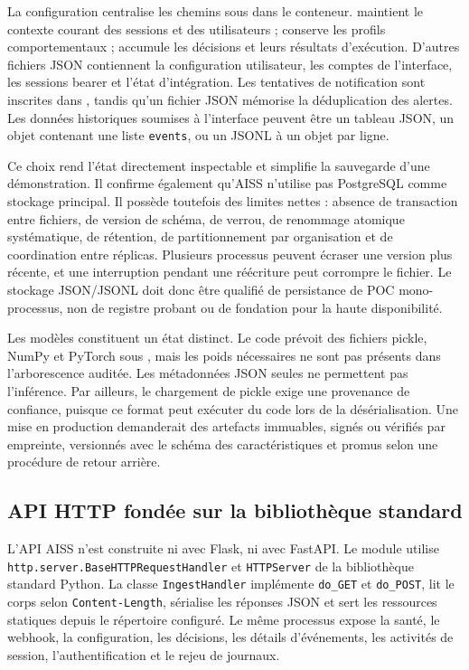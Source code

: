 \documentclass[11pt,a4paper,oneside]{report}
\theoremstyle{definition}
\theoremstyle{plain}
\begin{document}
La configuration centralise les chemins sous  dans le
conteneur.  maintient le contexte courant des
sessions et des utilisateurs ;  conserve les
profils comportementaux ;  accumule les décisions et
leurs résultats d'exécution. D'autres fichiers JSON contiennent la
configuration utilisateur, les comptes de l'interface, les sessions bearer
et l'état d'intégration. Les tentatives de notification sont inscrites dans
, tandis qu'un fichier JSON mémorise la déduplication
des alertes. Les données historiques soumises à l'interface peuvent être un
tableau JSON, un objet contenant une liste \texttt{events}, ou un JSONL à un
objet par ligne.

Ce choix rend l'état directement inspectable et simplifie la sauvegarde d'une
démonstration. Il confirme également qu'AISS n'utilise pas PostgreSQL comme
stockage principal. Il possède toutefois des limites nettes : absence de
transaction entre fichiers, de version de schéma, de verrou, de renommage
atomique systématique, de rétention, de partitionnement par organisation et
de coordination entre réplicas. Plusieurs processus peuvent écraser une
version plus récente, et une interruption pendant une réécriture peut
corrompre le fichier. Le stockage JSON/JSONL doit donc être qualifié de
persistance de POC mono-processus, non de registre probant ou de fondation
pour la haute disponibilité.

Les modèles constituent un état distinct. Le code prévoit des fichiers
pickle, NumPy et PyTorch sous , mais les poids nécessaires
ne sont pas présents dans l'arborescence auditée. Les métadonnées JSON seules
ne permettent pas l'inférence. Par ailleurs, le chargement de pickle exige
une provenance de confiance, puisque ce format peut exécuter du code lors de
la désérialisation. Une mise en production demanderait des artefacts
immuables, signés ou vérifiés par empreinte, versionnés avec le schéma des
caractéristiques et promus selon une procédure de retour arrière.

\subsection{API HTTP fondée sur la bibliothèque standard}

L'API AISS n'est construite ni avec Flask, ni avec FastAPI. Le module
 utilise
\texttt{http.server.BaseHTTPRequestHandler} et \texttt{HTTPServer} de la
bibliothèque standard Python. La classe \texttt{IngestHandler} implémente
\texttt{do\_GET} et \texttt{do\_POST}, lit le corps selon
\texttt{Content-Length}, sérialise les réponses JSON et sert les ressources
statiques depuis le répertoire configuré. Le même processus expose la santé,
le webhook, la configuration, les décisions, les détails d'événements, les
activités de session, l'authentification et le rejeu de journaux.
\end{document}
